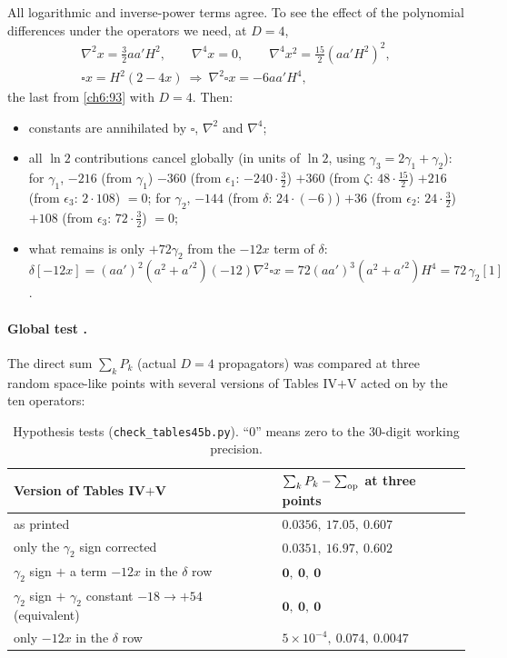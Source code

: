 All logarithmic and inverse-power terms agree. To see the effect of the polynomial differences under the operators we need, at $D=4$,
\begin{gather}
\nabla^2x=\tfrac32aa'H^2,\qquad \nabla^4x=0,\qquad \nabla^4x^2=\tfrac{15}{2}(aa'H^2)^2,\nonumber\\
\square x=H^2(2-4x)\ \Rightarrow\ \nabla^2\square x=-6aa'H^4,
\end{gather}
the last from \eqref{ch6:93} with $D=4$. Then:
\begin{itemize}[leftmargin=14pt]
\item constants are annihilated by $\square$, $\nabla^2$ and $\nabla^4$;
\item all $\ln2$ contributions cancel globally (in units of $\ln2$, using $\gamma_3=2\gamma_1+\gamma_2$): for $\gamma_1$,
$-216$ (from $\gamma_1$) $-360$ (from $\epsilon_1$: $-240\cdot\frac32$) $+360$ (from $\zeta$: $48\cdot\frac{15}2$) $+216$ (from $\epsilon_3$: $2\cdot108$) $=0$;
for $\gamma_2$, $-144$ (from $\delta$: $24\cdot(-6)$) $+36$ (from $\epsilon_2$: $24\cdot\frac32$) $+108$ (from $\epsilon_3$: $72\cdot\frac32$) $=0$;
\item what remains is only $+72\gamma_2$ from the $-12x$ term of $\delta$:
$\delta[-12x]=(aa')^2(a^2+a'^2)(-12)\nabla^2\square x=72(aa')^3(a^2+a'^2)H^4=72\,\gamma_2[1]$.
\end{itemize}

\paragraph{Global test \tC.} The direct sum $\sum_kP_k$ (actual $D=4$ propagators) was compared at three random space-like points with several
versions of Tables IV$+$V acted on by the ten operators:

\begin{table}[ht]
\centering\small
\renewcommand{\arraystretch}{1.3}
\begin{tabular}{ll}
\toprule
Version of Tables IV$+$V & $\sum_kP_k-\sum_{\rm op}$ at three points\\
\midrule
as printed & $0.0356,\ 17.05,\ 0.607$\\
only the $\gamma_2$ sign corrected & $0.0351,\ 16.97,\ 0.602$\\
$\gamma_2$ sign $+$ a term $-12x$ in the $\delta$ row & $\mathbf{0,\ 0,\ 0}$\\
$\gamma_2$ sign $+$ $\gamma_2$ constant $-18\to+54$ (equivalent) & $\mathbf{0,\ 0,\ 0}$\\
only $-12x$ in the $\delta$ row & $5\times10^{-4},\ 0.074,\ 0.0047$\\
\bottomrule
\end{tabular}
\caption{Hypothesis tests (\texttt{check\_tables45b.py}). ``0'' means zero to the 30-digit working precision.}
\label{ch6:tab:hyp}
\end{table}

